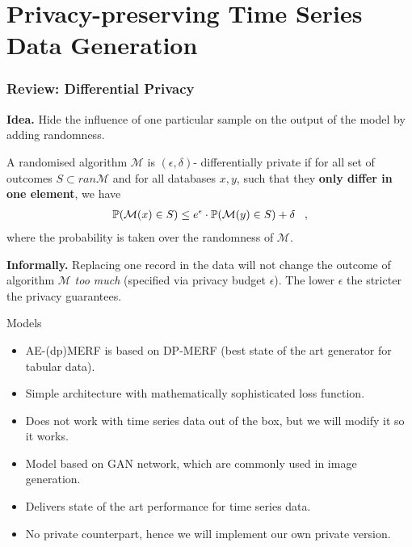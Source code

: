 \section{Privacy-preserving Time Series Data Generation}

\begin{frame}
    \frametitle{Review: Differential Privacy}
    \textbf{Idea.} Hide the influence of one particular sample on the output of the model by adding randomness.
    \begin{definition}
        A randomised algorithm $\mathcal{M}$ is $(\epsilon, \delta)$- differentially private if for all  set of outcomes $S \subset ran \mathcal{M}$ and for all databases $x,y $, such that they \textbf{only differ in one element}, we have
        \begin{align}
            \mathbb{P}(\mathcal{M}(x) \in S) \le e^\epsilon \cdot \mathbb{P}(\mathcal{M}(y) \in S) + \delta \;\;\;,
        \end{align}
        where the probability is taken over the randomness of $\mathcal{M}$.
    \end{definition}

    \textbf{Informally.} Replacing one record in the data will not change the outcome of algorithm $\mathcal{M}$ \textit{too much} (specified via privacy budget $\epsilon$). The lower $\epsilon$ the stricter the privacy guarantees.

\end{frame}

\begin{frame}{Models}
    \begin{itemize}
        \item<1-> AE-(dp)MERF is based on DP-MERF (best state of the art generator for tabular data).
        \item<2-> Simple architecture with mathematically sophisticated loss function.
        \item<3-> Does not work with time series data out of the box, but we will modify it so it works.
    \end{itemize}
    \begin{itemize}
        \item<5-> Model based on GAN network, which are commonly used in image generation.
        \item<6-> Delivers state of the art performance for time series data.
        \item<7> No private counterpart, hence we will implement our own private version.
    \end{itemize}
    
\end{frame}

